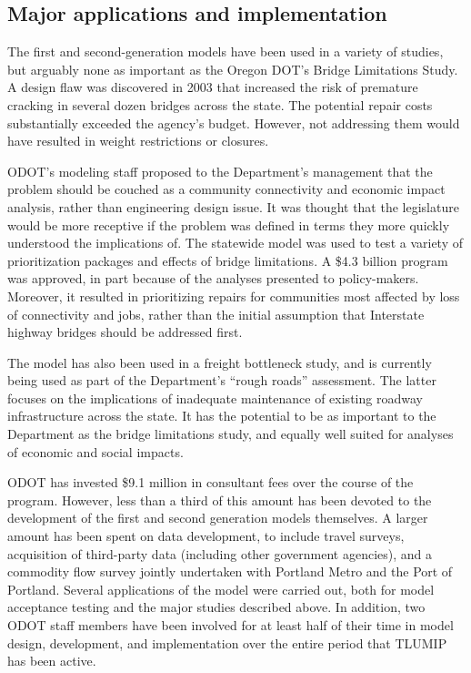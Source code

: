 \subsection{Major applications and implementation}

The first and second-generation models have been used in a variety of studies, but arguably none as important as the Oregon DOT's Bridge Limitations Study. A design flaw was discovered in 2003 that increased the risk of premature cracking in several dozen bridges across the state. The potential repair costs substantially exceeded the agency's budget. However, not addressing them would have resulted in weight restrictions or closures. 

ODOT's modeling staff proposed to the Department's management that the problem should be couched as a community connectivity and economic impact analysis, rather than engineering design issue. It was thought that the legislature would be more receptive if the problem was defined in terms they more quickly understood the implications of. The statewide model was used to test a variety of prioritization packages and effects of bridge limitations. A \$4.3 billion program was approved, in part because of the analyses presented to policy-makers. Moreover, it resulted in prioritizing repairs for communities most affected by loss of connectivity and jobs, rather than the initial assumption that Interstate highway bridges should be addressed first.

The model has also been used in a freight bottleneck study, and is currently being used as part of the Department's ``rough roads'' assessment. The latter focuses on the implications of inadequate maintenance of existing roadway infrastructure across the state. It has the potential to be as important to the Department as the bridge limitations study, and equally well suited for analyses of economic and social impacts.

ODOT has invested \$9.1 million in consultant fees over the course of the program. However, less than a third of this amount has been devoted to the development of the first and second generation models themselves. A larger amount has been spent on data development, to include travel surveys, acquisition of third-party data (including other government agencies), and a commodity flow survey jointly undertaken with Portland Metro and the Port of Portland. Several applications of the model were carried out, both for model acceptance testing and the major studies described above. In addition, two ODOT staff members have been involved for at least half of their time in model design, development, and implementation over the entire period that TLUMIP has been active.

